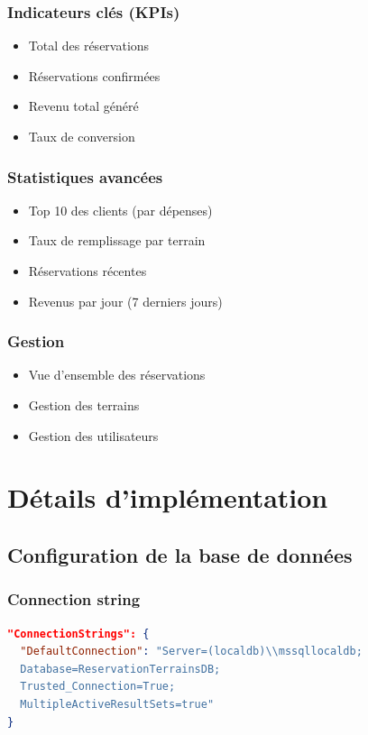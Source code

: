 \documentclass[12pt,a4paper]{article}
\begin{document}
\subsubsection{Indicateurs clés (KPIs)}
\begin{itemize}
    \item Total des réservations
    \item Réservations confirmées
    \item Revenu total généré
    \item Taux de conversion
\end{itemize}

\subsubsection{Statistiques avancées}
\begin{itemize}
    \item Top 10 des clients (par dépenses)
    \item Taux de remplissage par terrain
    \item Réservations récentes
    \item Revenus par jour (7 derniers jours)
\end{itemize}

\subsubsection{Gestion}
\begin{itemize}
    \item Vue d'ensemble des réservations
    \item Gestion des terrains
    \item Gestion des utilisateurs
\end{itemize}

\section{Détails d'implémentation}

\subsection{Configuration de la base de données}
\subsubsection{Connection string}
\begin{lstlisting}[language=json]
"ConnectionStrings": {
  "DefaultConnection": "Server=(localdb)\\mssqllocaldb;
  Database=ReservationTerrainsDB;
  Trusted_Connection=True;
  MultipleActiveResultSets=true"
}
\end{lstlisting}
\end{document}
